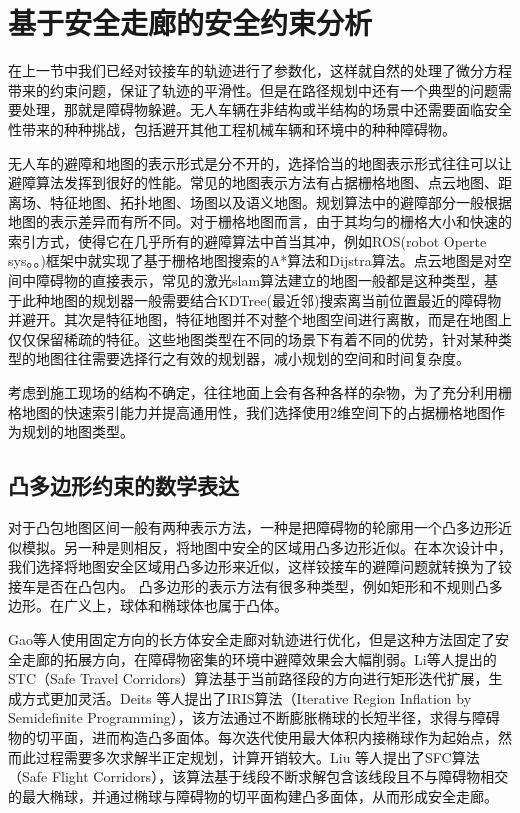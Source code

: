 \documentclass[master,academic]{ysuthesis} %
\begin{document}
	\section{基于安全走廊的安全约束分析}
	在上一节中我们已经对铰接车的轨迹进行了参数化，这样就自然的处理了微分方程带来的约束问题，保证了轨迹的平滑性。但是在路径规划中还有一个典型的问题需要处理，那就是障碍物躲避。无人车辆在非结构或半结构的场景中还需要面临安全性带来的种种挑战，包括避开其他工程机械车辆和环境中的种种障碍物。

	无人车的避障和地图的表示形式是分不开的，选择恰当的地图表示形式往往可以让避障算法发挥到很好的性能。常见的地图表示方法有占据栅格地图、点云地图、距离场、特征地图、拓扑地图、场图以及语义地图。规划算法中的避障部分一般根据地图的表示差异而有所不同。对于栅格地图而言，由于其均匀的栅格大小和快速的索引方式，使得它在几乎所有的避障算法中首当其冲，例如ROS(robot Operte sys。。)框架中就实现了基于栅格地图搜索的A*算法和Dijstra算法。点云地图是对空间中障碍物的直接表示，常见的激光slam算法建立的地图一般都是这种类型，基于此种地图的规划器一般需要结合KDTree(最近邻)搜索离当前位置最近的障碍物并避开。其次是特征地图，特征地图并不对整个地图空间进行离散，而是在地图上仅仅保留稀疏的特征。这些地图类型在不同的场景下有着不同的优势，针对某种类型的地图往往需要选择行之有效的规划器，减小规划的空间和时间复杂度。
	
	考虑到施工现场的结构不确定，往往地面上会有各种各样的杂物，为了充分利用栅格地图的快速索引能力并提高通用性，我们选择使用2维空间下的占据栅格地图作为规划的地图类型。
		\subsection{凸多边形约束的数学表达}
		对于凸包地图区间一般有两种表示方法，一种是把障碍物的轮廓用一个凸多边形近似模拟。另一种是则相反，将地图中安全的区域用凸多边形近似。在本次设计中，我们选择将地图安全区域用凸多边形来近似，这样铰接车的避障问题就转换为了铰接车是否在凸包内。
		凸多边形的表示方法有很多种类型，例如矩形和不规则凸多边形。在广义上，球体和椭球体也属于凸体。
		
		Gao等人使用固定方向的长方体安全走廊对轨迹进行优化，但是这种方法固定了安全走廊的拓展方向，在障碍物密集的环境中避障效果会大幅削弱\cite{Gao2018OnlineST}。Li等人提出的STC（Safe Travel Corridors）算法基于当前路径段的方向进行矩形迭代扩展，生成方式更加灵活\cite{BaiLi:2022}。Deits 等人提出了IRIS算法（Iterative Region Inflation by Semidefinite Programming），该方法通过不断膨胀椭球的长短半径，求得与障碍物的切平面，进而构造凸多面体\cite{Deits:2015}。每次迭代使用最大体积内接椭球作为起始点，然而此过程需要多次求解半正定规划，计算开销较大。Liu 等人提出了SFC算法（Safe Flight Corridors），该算法基于线段不断求解包含该线段且不与障碍物相交的最大椭球，并通过椭球与障碍物的切平面构建凸多面体，从而形成安全走廊\cite{SikangLiu:2017}。
		
\end{document}
